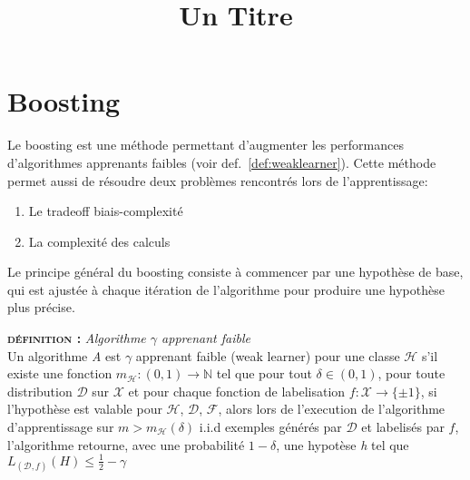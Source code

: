 \documentclass[12pt, a4paper]{article}
\title{Un Titre}
\newcounter{NoDef}
\newenvironment{definition}[1]{
    \refstepcounter{NoDef}
    
    
    \vspace{0.3cm}
    \textbf{\textsc{définition \theNoDef:}} \textit{#1}\\
}{

\vspace{0.3cm}
}
\begin{document}
\maketitle

\section{Boosting}

    Le boosting est une méthode permettant d'augmenter les performances\\ d'algorithmes apprenants
    faibles (voir def.~\ref{def:weaklearner}). Cette méthode permet aussi de résoudre deux problèmes
    rencontrés lors de l'apprentissage:
    \begin{enumerate}
        \item Le tradeoff biais-complexité
        \item La complexité des calculs
    \end{enumerate}
    Le principe général du boosting consiste à commencer par une hypothèse de base,
    qui est ajustée à chaque itération de l'algorithme pour produire une hypothèse plus précise.


    \begin{definition}{Algorithme $\gamma$ apprenant faible}
    Un algorithme \textit{A} est $\gamma$ apprenant faible (weak learner) pour une classe
    $\mathcal{H}$ s'il existe une fonction $m_{\mathcal{H}}: (0,1) \rightarrow \mathbb{N}$ tel que 
    pour tout $\delta \in (0,1)$, pour toute distribution $\mathcal{D}$ sur $\mathcal{X}$ et pour
    chaque fonction de labelisation $f:\mathcal{X} \rightarrow \{\pm 1\}$, si l'hypothèse est
    valable pour $\mathcal{H}$, $\mathcal{D}$, $\mathcal{F}$, alors lors de l'execution de l'algorithme
    d'apprentissage sur $m > m_{\mathcal{H}}(\delta)$ i.i.d exemples générés par $\mathcal{D}$ et
    labelisés par $f$, l'algorithme retourne, avec une probabilité $1- \delta$, une hypotèse
    \textit{h} tel que $L_{(\mathcal{D}, f)}(H) \leq \frac{1}{2} - \gamma$
    \label{def:weaklearner}
    \end{definition}
\end{document}
